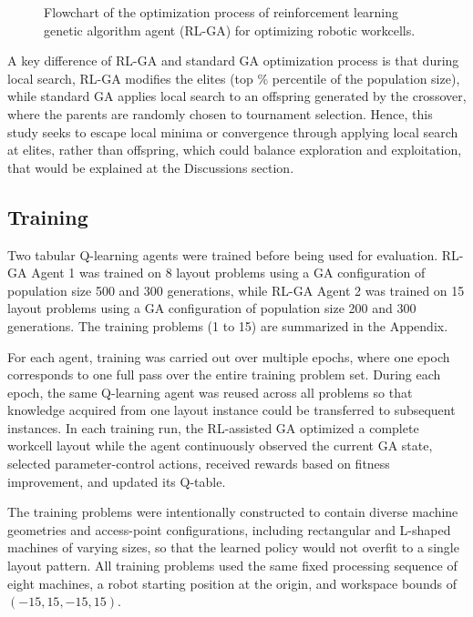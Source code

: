 \documentclass{article}
\begin{document}
\begin{figure}[H]
{\begin{tikzpicture}
\end{tikzpicture}%
}
\caption{Flowchart of the optimization process of reinforcement learning genetic algorithm agent (RL-GA) for optimizing robotic workcells.}
\label{fig:rlga_flowchart}
\end{figure}

A key difference of RL-GA and standard GA optimization process is that during local search, RL-GA modifies the elites (top \% percentile of the population size), while standard GA applies local search to an offspring generated by the crossover, where the parents are randomly chosen to tournament selection. Hence, this study seeks to escape local minima or convergence through applying local search at elites, rather than offspring, which could balance exploration and exploitation, that would be explained at the Discussions section.

\subsection{Training}

Two tabular Q-learning agents were trained before being used for evaluation. RL-GA Agent 1 was trained on 8 layout problems using a GA configuration of population size 500 and 300 generations, while RL-GA Agent 2 was trained on 15 layout problems using a GA configuration of population size 200 and 300 generations. The training problems (1 to 15) are summarized in the Appendix.

For each agent, training was carried out over multiple epochs, where one epoch corresponds to one full pass over the entire training problem set. During each epoch, the same Q-learning agent was reused across all problems so that knowledge acquired from one layout instance could be transferred to subsequent instances. In each training run, the RL-assisted GA optimized a complete workcell layout while the agent continuously observed the current GA state, selected parameter-control actions, received rewards based on fitness improvement, and updated its Q-table.

The training problems were intentionally constructed to contain diverse machine geometries and access-point configurations, including rectangular and L-shaped machines of varying sizes, so that the learned policy would not overfit to a single layout pattern. All training problems used the same fixed processing sequence of eight machines, a robot starting position at the origin, and workspace bounds of $(-15,15,-15,15)$.
\end{document}

